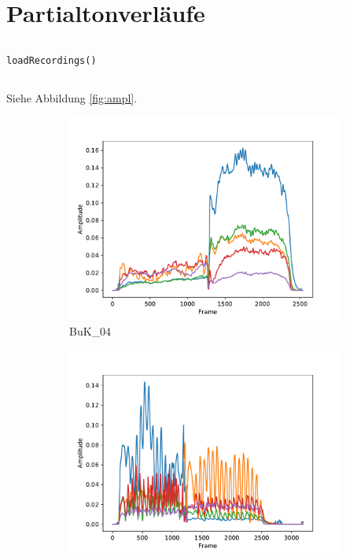 \section{Partialtonverläufe}
\label{sec:1}

\subsection{}
\texttt{loadRecordings()}

\subsection{}
Siehe Abbildung \ref{fig:ampl}.

\begin{figure}[H]
    \centering
    \begin{subfigure}{.5\textwidth}
        \centering
        \includegraphics[width=\linewidth]{Figures/Buk04_amplitudes.pdf}
        \caption{BuK\_04}
        \label{fig:sub1}
    \end{subfigure}%
    \begin{subfigure}{.5\textwidth}
        \centering
        \includegraphics[width=\linewidth]{Figures/Buk23_amplitudes.pdf}

\end{subfigure}
\end{figure}
